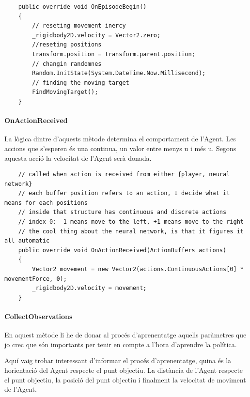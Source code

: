 \documentclass{article}
\begin{document}
    \begin{lstlisting}
    public override void OnEpisodeBegin()
    {
        // reseting movement inercy
        _rigidbody2D.velocity = Vector2.zero;
        //reseting positions
        transform.position = transform.parent.position;
        // changin randomnes
        Random.InitState(System.DateTime.Now.Millisecond);
        // finding the moving target
        FindMovingTarget();
    }
    \end{lstlisting}
    
    \paragraph{OnActionReceived}
    
    La lògica dintre d'aquests mètode determina el comportament de l'Agent.
    Les accions que s'esperen és una continua, un valor entre menys u i més u. Segons aquesta acció la velocitat de l'Agent serà donada.
    
    \begin{lstlisting}
    // called when action is received from either {player, neural network}
    // each buffer position refers to an action, I decide what it means for each positions
    // inside that structure has continuous and discrete actions
    // index 0: -1 means move to the left, +1 means move to the right
    // the cool thing about the neural network, is that it figures it all automatic
    public override void OnActionReceived(ActionBuffers actions)
    {
        Vector2 movement = new Vector2(actions.ContinuousActions[0] * movementForce, 0);
        _rigidbody2D.velocity = movement;
    }
    \end{lstlisting}
    
    \paragraph{CollectObservations}
    
    En aquest mètode li he de donar al procés d'aprenentatge aquells paràmetres que jo crec que són importants per tenir en compte a l'hora d'aprendre la política.

    Aquí vaig trobar interessant d'informar el procés d'aprenentatge, quina és la horientació del Agent respecte el punt objectiu. La distància de l'Agent respecte el punt objectiu, la posició del punt objectiu i finalment la velocitat de moviment de l'Agent.
    
\end{document}
